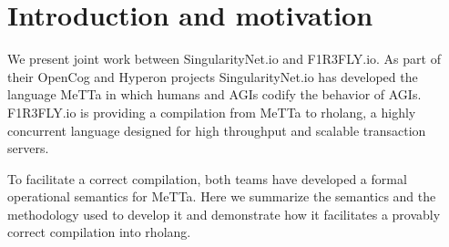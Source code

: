 \section{Introduction and motivation}
We present joint work between SingularityNet.io and F1R3FLY.io. As part of their OpenCog and Hyperon projects SingularityNet.io has developed the language MeTTa in which humans and AGIs codify the behavior of AGIs. F1R3FLY.io is providing a compilation from MeTTa to rholang, a highly concurrent language designed for high throughput and scalable transaction servers.

To facilitate a correct compilation, both teams have developed a formal operational semantics for MeTTa. Here we summarize the semantics and the methodology used to develop it and demonstrate how it facilitates a provably correct compilation into rholang.
